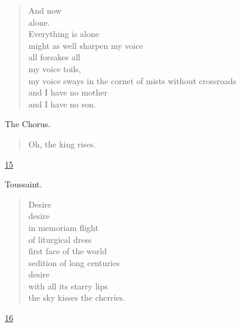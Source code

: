 \documentclass[letterpaper,article,12pt,oneside,notitlepage]{memoir}
\begin{document}
\begin{verse}
And now \\
alone. \\
Everything is alone \\
might as well sharpen my voice \\
all forsakes all \\
my voice toils, \\
my voice sways in the cornet of mists without crossroads \\
and I have no mother \\
and I have no son. \\
\end{verse}

\begin{center}The Chorus.\end{center}

\begin{verse}
Oh, the king rises. \\
\end{verse}

\clearpage

\href{http://cesaire.elotroalex.com/chiens/chiens/p015.html}{15}

\begin{center}Toussaint.\end{center}

\begin{verse}
Desire \\
desire \\
in memoriam flight \\
of liturgical dress \\
first face of the world \\
sedition of long centuries \\
desire \\
with all its starry lips \\
the sky kisses the cherries. \\
\end{verse}

\clearpage

\href{http://cesaire.elotroalex.com/chiens/chiens/p016.html}{16}
\end{document}
